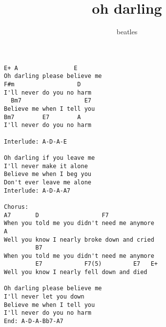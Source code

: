 \author{beatles}
\title{oh darling}
\maketitle
\begin{verbatim}
E+ A                E
Oh darling please believe me
F#m                  D
I'll never do you no harm
  Bm7                  E7
Believe me when I tell you
Bm7        E7        A
I'll never do you no harm

Interlude: A-D-A-E

Oh darling if you leave me
I'll never make it alone
Believe me when I beg you
Don't ever leave me alone
Interlude: A-D-A-A7

Chorus:
A7       D                  F7
When you told me you didn't need me anymore
A
Well you know I nearly broke down and cried
         B7
When you told me you didn't need me anymore
         E7            F7(5)         E7   E+
Well you know I nearly fell down and died

Oh darling please believe me
I'll never let you down 
Believe me when I tell you
I'll never do you no harm
End: A-D-A-Bb7-A7
\end{verbatim}